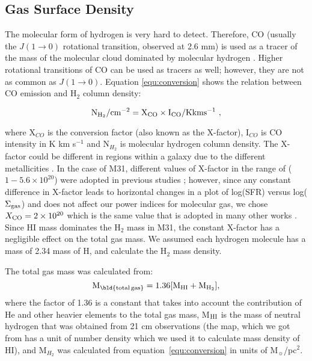 \documentclass[useAMS,usenatbib]{mn2e}
\begin{document}


\subsection{Gas Surface Density}
\label{sec:ISM}

 The molecular form of hydrogen is very hard to detect. Therefore, CO (usually the $J(1\rightarrow 0)$ rotational transition, observed at 2.6 mm) is used as a tracer of the mass of the molecular cloud dominated by molecular hydrogen \citep[see, for example,][] {Sanders84}. Higher rotational transitions of CO can be used as tracers as well; however, they are not as common as $J(1\rightarrow 0)$. Equation \ref{equ:conversion} shows the relation between CO emission and H$_2$ column density:

\begin{equation}
\label{equ:conversion}
\rm N_{H_2}/\rm cm^{-2} = X_{CO} \times I_{CO}/\rm K km s^{-1} ~,
\end{equation}

\noindent where X$_{CO}$ is the conversion factor (also known as the X-factor), I$_{CO}$ is CO intensity in  K km s$^{-1}$ and N$_{H_2}$ is molecular hydrogen column density. The X-factor could be different in regions within a galaxy due to the different metallicities \citep{Wilson95, Bosselli02, Bolato13}. In the case of M31, different values of X-factor in the range of ($1-5.6 \times 10^{20}$) were adopted in previous studies \citep[e.g.][]{Ford13, Bolato13, Leroy11, Bolato08, Nieten06}; however, since any constant difference in X-factor leads to horizontal changes in a plot of log(SFR) versus log($\Sigma_{\rm {gas}}$) and does not affect our power indices for molecular gas, we chose $X_{\rm {CO}}= 2 \times 10^{20}$ which is the same value that is adopted in many other works \citep[e.g.][]{Ford13, Smith12}. Since HI mass dominates the H$_2$ mass in M31, the constant X-factor has a negligible effect on the total gas mass. We assumed each hydrogen molecule has a mass of 2.34 mass of H, and calculate the H$_2$ mass density.

The total gas mass was calculated from:
\begin{equation}
\label{equ:total_gas}
\rm M_{\rm \bld {total \, gas}} = 1.36[M_{\rm HI}+M_{H_2}],
\end{equation}
\noindent where the factor of 1.36 is a constant that takes into account the contribution of He and other heavier elements to the total gas mass, M$_{\rm HI}$ is the mass of neutral hydrogen that was obtained from 21 cm observations (the map, which we got from \cite{Chemin09} has a unit of number density which we used it to calculate mass density of HI), and M$_{H_2}$ was calculated from equation~\ref{equ:conversion} in units of M$_{\sun}$/pc$^2$.
\end{document}
